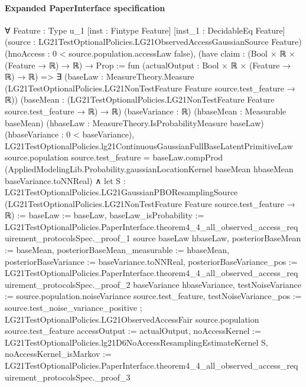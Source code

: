 \documentclass[10pt]{article}
\begin{document}
\paragraph{Expanded PaperInterface specification}
\begin{ReviewVerbatim}
∀ {Feature : Type u_1} [inst : Fintype Feature] [inst_1 : DecidableEq Feature]
  (source : LG21TestOptionalPolicies.LG21ObservedAccessGaussianSource Feature)
  (hnoAccess : 0 < source.population.accessLaw {false}),
  (have claim : (Bool × ℝ × (Feature → ℝ) → ℝ) → Prop := fun (actualOutput : Bool × ℝ × (Feature → ℝ) → ℝ) =>
      ∃ (baseLaw : MeasureTheory.Measure (LG21TestOptionalPolicies.LG21NonTestFeature Feature source.test_feature → ℝ))
        (baseMean : (LG21TestOptionalPolicies.LG21NonTestFeature Feature source.test_feature → ℝ) → ℝ) (baseVariance :
        ℝ) (hbaseMean : Measurable baseMean) (hbaseLaw : MeasureTheory.IsProbabilityMeasure baseLaw) (hbaseVariance :
        0 < baseVariance),
        LG21TestOptionalPolicies.lg21ContinuousGaussianFullBaseLatentPrimitiveLaw source.population
              source.test_feature =
            baseLaw.compProd
              (AppliedModelingLib.Probability.gaussianLocationKernel baseMean hbaseMean baseVariance.toNNReal) ∧
          let S :
            LG21TestOptionalPolicies.LG21GaussianPBOResamplingSource
              (LG21TestOptionalPolicies.LG21NonTestFeature Feature source.test_feature → ℝ) :=
            { baseLaw := baseLaw,
              baseLaw_isProbability :=
                LG21TestOptionalPolicies.PaperInterface.theorem4_4_all_observed_access_requirement_protocolsSpec._proof_1
                  source baseLaw hbaseLaw,
              posteriorBaseMean := baseMean, posteriorBaseMean_measurable := hbaseMean,
              posteriorBaseVariance := baseVariance.toNNReal,
              posteriorBaseVariance_pos :=
                LG21TestOptionalPolicies.PaperInterface.theorem4_4_all_observed_access_requirement_protocolsSpec._proof_2
                  baseVariance hbaseVariance,
              testNoiseVariance := source.population.noiseVariance source.test_feature,
              testNoiseVariance_pos := source.test_noise_variance_positive };
          LG21TestOptionalPolicies.LG21ObservedAccessFair source.population source.test_feature
            { accessOutput := actualOutput,
              noAccessKernel := LG21TestOptionalPolicies.lg21D6NoAccessResamplingEstimateKernel S,
              noAccessKernel_isMarkov :=
                LG21TestOptionalPolicies.PaperInterface.theorem4_4_all_observed_access_requirement_protocolsSpec._proof_3
}
\end{ReviewVerbatim}
\end{document}
